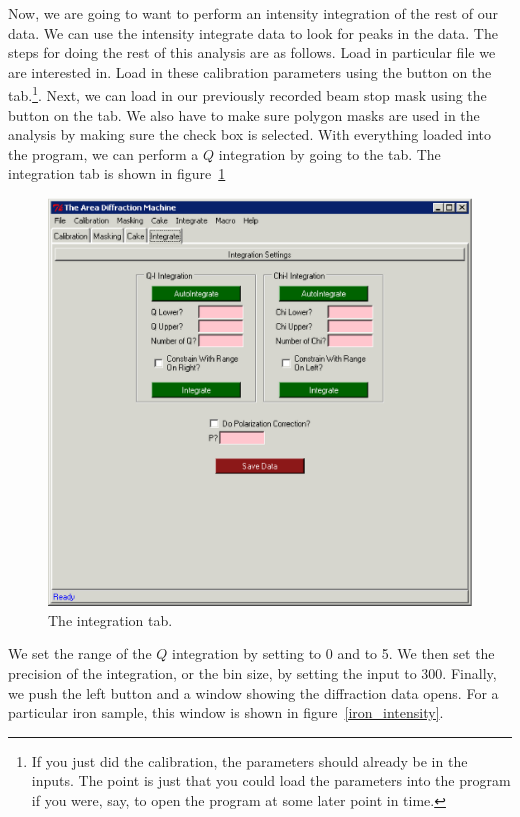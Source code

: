Now, we are going to want to perform an intensity integration 
of the rest of our data. We can use the intensity
integrate data to look for peaks in the data.
The steps for doing the rest of
this analysis are as follows. Load in particular file we
are interested in. Load in these calibration parameters
using the  button on the 
tab.\footnote{If you just did the calibration, the 
parameters should already be in the inputs. The point is
just that you could load the parameters into the program
if you were, say, to open the program at some later point
in time.}. Next, we can load in our previously recorded
beam stop mask using the  button on the
 tab. We also have to make sure polygon masks
are used in the analysis by making sure the 
 check box is selected.
With everything loaded into the program, 
we can perform a $Q$ integration by going to the 
 tab. The integration tab is shown in 
figure~\ref{integration_tab_example}

\begin{figure}
    \centering
    \includegraphics[scale=.75]{figures/integration_tab.eps}
    \caption{The integration tab.}
    \label{integration_tab_example}
\end{figure}

We set the range of the $Q$ integration by setting
 to 0 and  to 5. We
then set the precision of the integration, or the
bin size, by setting the  input
to 300. Finally, we push the left 
button and a window showing the diffraction data
opens. For a particular iron sample, this window
is shown in figure~\ref{iron_intensity}.

